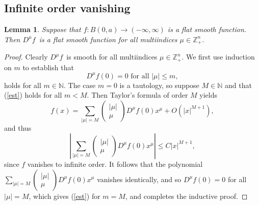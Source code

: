 \documentclass{amsart}
\theoremstyle{plain}
\newtheorem{lemma}[theorem]{Lemma}
\numberwithin{equation}{section}
\begin{document}
\subsection{Infinite order vanishing}

\begin{lemma}
\label{smooth}Suppose that $f:B\left( 0,a\right) \rightarrow \left( -\infty
,\infty \right) $ is a flat smooth function. Then $D^{\mu }f$\ is a flat
smooth function for all multiindices $\mu \in \mathbb{Z}_{+}^{n}$.
\end{lemma}

\begin{proof}
Clearly $D^{\mu }f$\ is smooth for all multiindices $\mu \in \mathbb{Z}%
_{+}^{n}$. We first use induction on $m$ to establish that%
\begin{equation}
D^{\mu }f\left( 0\right) =0\text{\ \ \ \ \ for all }\left\vert \mu
\right\vert \leq m,  \label{est}
\end{equation}%
holds for all $m\in \mathbb{N}$. The case $m=0$ is a tautology, so suppose $%
M\in \mathbb{N}$ and that (\ref{est}) holds for all $m<M$. Then Taylor's
formula of order $M$ yields%
\begin{equation*}
f\left( x\right) =\sum_{\left\vert \mu \right\vert =M}\left( 
\begin{array}{c}
\left\vert \mu \right\vert \\ 
\mu%
\end{array}%
\right) D^{\mu }f\left( 0\right) x^{\mu }+O\left( \left\vert x\right\vert
^{M+1}\right) ,
\end{equation*}%
and thus%
\begin{equation*}
\left\vert \sum_{\left\vert \mu \right\vert =M}\left( 
\begin{array}{c}
\left\vert \mu \right\vert \\ 
\mu%
\end{array}%
\right) D^{\mu }f\left( 0\right) x^{\mu }\right\vert \leq C\left\vert
x\right\vert ^{M+1},
\end{equation*}%
since $f$ vanishes to infinite order. It follows that the polynomial $%
\sum_{\left\vert \mu \right\vert =M}\left( 
\begin{array}{c}
\left\vert \mu \right\vert \\ 
\mu%
\end{array}%
\right) D^{\mu }f\left( 0\right) x^{\mu }$ vanishes identically, and so $%
D^{\mu }f\left( 0\right) =0$ for all $\left\vert \mu \right\vert =M$, which
gives (\ref{est}) for $m=M$, and completes the inductive proof.


\end{proof}
\end{document}
